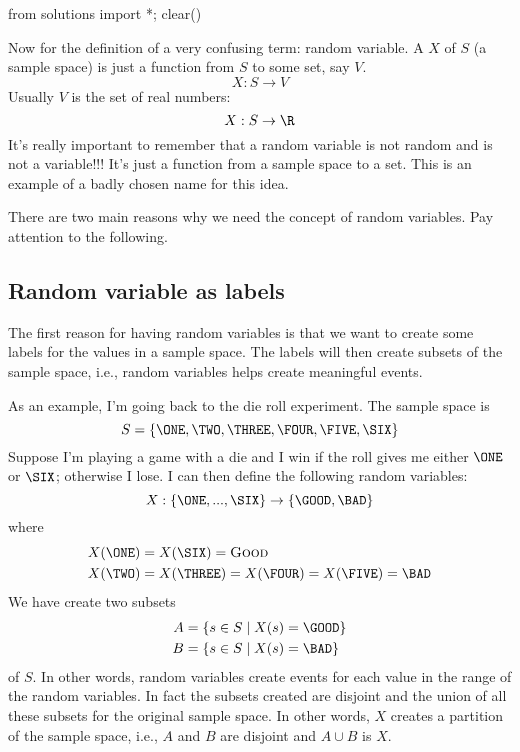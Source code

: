 \begin{python0}
from solutions import *; clear()
\end{python0}

Now for the definition of a very confusing term: random variable.
A  $X$ of $S$ (a sample space) is just a function
from $S$ to some set, say $V$.
\[
  X : S \rightarrow V
\]
Usually $V$ is the set of real numbers:
\[
  X : S \rightarrow \R
\]
It's really important to remember that a random variable
is not random and is not a variable!!!
It's just a function from a sample space to a set.
This is an example of a badly chosen name for this idea.

There are two main reasons why we need the concept of random variables.
Pay attention to the following.



\newpage
\subsection{Random variable as labels}

The first reason for having random variables is
that we want to create some 
labels for the values in a sample space.
The labels will then create subsets of the sample space, i.e.,
random variables helps create meaningful events.

As an example, I'm going back to the die roll experiment.
The sample space is
\[
S = \{\ONE, \TWO, \THREE, \FOUR, \FIVE, \SIX \}
\]
Suppose I'm playing a game with a die and I win
if the roll gives me either $\ONE$ or $\SIX$;
otherwise I lose.
I can then define the following
random variables:
\[
  X : \{ \ONE, ..., \SIX \} \rightarrow \{ \GOOD, \BAD \}
\]
where
\begin{align*}
  X(\ONE) &= X(\SIX) = \textsc{Good} \\
  X(\TWO) &= X(\THREE) = X(\FOUR) = X(\FIVE) = \BAD 
\end{align*}
We have create two subsets
\begin{align*}
  A &= \{ s \in S \mid X(s) = \GOOD \} \\
  B &= \{ s \in S \mid X(s) = \BAD \}
\end{align*}
of $S$.
In other words, random variables create events for each
value in the range of the random variables.
In fact the subsets created are disjoint
and the union of all these subsets for the original
sample space.
In other words, $X$ creates a partition of the sample space,
i.e., $A$ and $B$ are disjoint and $A \cup B$ is $X$.

